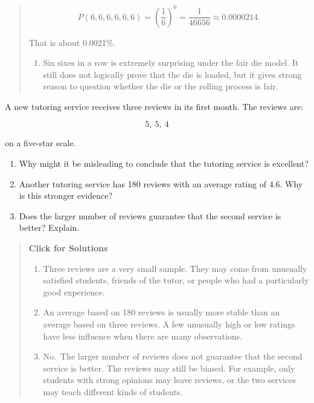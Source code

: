 \documentclass[
  letterpaper,
  DIV=11,
  numbers=noendperiod]{scrreprt}
\providecommand{\tightlist}{%
  \setlength{\itemsep}{0pt}\setlength{\parskip}{0pt}}
\begin{document}
\begin{tcolorbox}
\begin{quote}
\[
P(6,6,6,6,6,6)
=
\left(\frac{1}{6}\right)^6
=
\frac{1}{46656}
\approx 0.0000214.
\]

That is about 0.0021\%.

\begin{enumerate}
\def\labelenumi{\alph{enumi}.}
\setcounter{enumi}{3}
\tightlist
\item
  Six sixes in a row is extremely surprising under the fair die model.
  It still does not logically prove that the die is loaded, but it gives
  strong reason to question whether the die or the rolling process is
  fair.
\end{enumerate}
\end{quote}

\end{tcolorbox}

\begin{tcolorbox}[enhanced jigsaw, arc=.35mm, bottomrule=.15mm, bottomtitle=1mm, breakable, colback=white, colbacktitle=quarto-callout-note-color!10!white, colframe=quarto-callout-note-color-frame, coltitle=black, left=2mm, leftrule=.75mm, opacityback=0, opacitybacktitle=0.6, rightrule=.15mm, title=\textcolor{quarto-callout-note-color}{\faInfo}\hspace{0.5em}{Question 4}, titlerule=0mm, toprule=.15mm, toptitle=1mm]

A new tutoring service receives three reviews in its first month. The
reviews are:

\[
5,\ 5,\ 4
\]

on a five-star scale.

\begin{enumerate}
\def\labelenumi{\alph{enumi}.}
\item
  Why might it be misleading to conclude that the tutoring service is
  excellent?
\item
  Another tutoring service has 180 reviews with an average rating of
  4.6. Why is this stronger evidence?
\item
  Does the larger number of reviews guarantee that the second service is
  better? Explain.
\end{enumerate}

\begin{quote}
\textbf{Click for Solutions}

\begin{enumerate}
\def\labelenumi{\alph{enumi}.}
\item
  Three reviews are a very small sample. They may come from unusually
  satisfied students, friends of the tutor, or people who had a
  particularly good experience.
\item
  An average based on 180 reviews is usually more stable than an average
  based on three reviews. A few unusually high or low ratings have less
  influence when there are many observations.
\item
  No.~The larger number of reviews does not guarantee that the second
  service is better. The reviews may still be biased. For example, only
  students with strong opinions may leave reviews, or the two services
  may teach different kinds of students.
\end{enumerate}
\end{quote}


\end{tcolorbox}
\end{document}
